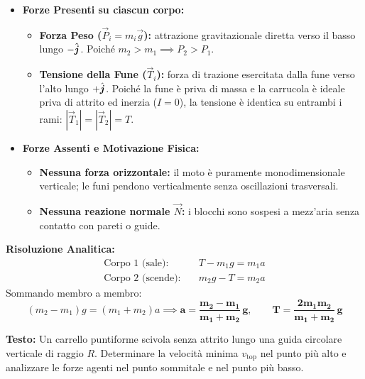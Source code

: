 \begin{tcolorbox}[enhanced, breakable, colback=forestgreen!5!white, colframe=forestgreen!80!black,
    title={\textbf{Analisi delle Forze in Gioco per la Macchina di Atwood}}, fonttitle=\bfseries\sffamily]
\begin{itemize}
    \item \textbf{Forze Presenti su ciascun corpo:}
    \begin{itemize}
        \item \textbf{Forza Peso ($\vec{P}_i = m_i\vec{g}$):} attrazione gravitazionale diretta verso il basso lungo $-\hat{\bm{j}}$. Poiché $m_2 > m_1 \implies P_2 > P_1$.
        \item \textbf{Tensione della Fune ($\vec{T}_i$):} forza di trazione esercitata dalla fune verso l'alto lungo $+\hat{\bm{j}}$. Poiché la fune è priva di massa e la carrucola è ideale priva di attrito ed inerzia ($I=0$), la tensione è identica su entrambi i rami: $|\vec{T}_1| = |\vec{T}_2| = T$.
    \end{itemize}
    \item \textbf{Forze Assenti e Motivazione Fisica:}
    \begin{itemize}
        \item \textbf{Nessuna forza orizzontale:} il moto è puramente monodimensionale verticale; le funi pendono verticalmente senza oscillazioni trasversali.
        \item \textbf{Nessuna reazione normale $\vec{N}$:} i blocchi sono sospesi a mezz'aria senza contatto con pareti o guide.
    \end{itemize}
\end{itemize}
\end{tcolorbox}

\textbf{Risoluzione Analitica:}
\begin{align}
    \text{Corpo 1 (sale):} \quad & T - m_1 g = m_1 a \label{eq:atwood_1_fbd} \\
    \text{Corpo 2 (scende):} \quad & m_2 g - T = m_2 a \label{eq:atwood_2_fbd}
\end{align}
Sommando membro a membro:
\begin{equation}
    (m_2 - m_1)g = (m_1 + m_2)a \implies \mathbf{a = \frac{m_2 - m_1}{m_1 + m_2}\,g}, \qquad \mathbf{T = \frac{2 m_1 m_2}{m_1 + m_2}\,g}
\end{equation}

\vspace{0.8em}

\begin{esercizio}
\textbf{Testo:}
Un carrello puntiforme scivola senza attrito lungo una guida circolare verticale di raggio $R$. Determinare la velocità minima $v_{\text{top}}$ nel punto più alto e analizzare le forze agenti nel punto sommitale e nel punto più basso.
\end{esercizio}

